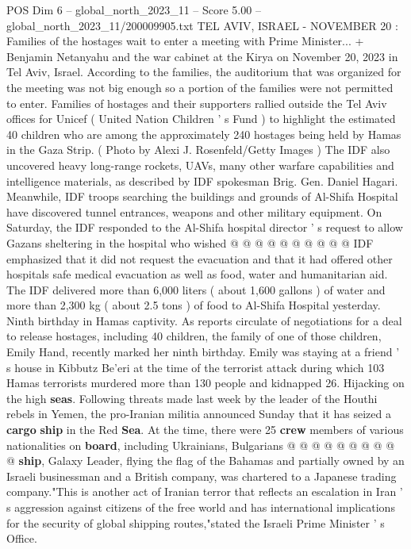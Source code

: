 \begin{textsample}{POS Dim 6 – global\_north\_2023\_11 – Score 5.00 – global\_north\_2023\_11/200009905.txt}  \label{ex:f6_pos_259}
TEL AVIV, ISRAEL - NOVEMBER 20 : Families of the hostages wait to enter a meeting with Prime Minister... + Benjamin Netanyahu and the war cabinet at the Kirya on November 20, 2023 in Tel Aviv, Israel.
According to the families, the auditorium that was organized for the meeting was not big enough so a portion of the families were not permitted to enter.
Families of hostages and their supporters rallied outside the Tel Aviv offices for Unicef ( United Nation Children ' s Fund ) to highlight the estimated 40 children who are among the approximately 240 hostages being held by Hamas in the Gaza Strip. ( Photo by Alexi J.
Rosenfeld/Getty Images ) The IDF also uncovered heavy long-range rockets, UAVs, many other warfare capabilities and intelligence materials, as described by IDF spokesman Brig.
Gen.
Daniel Hagari.
Meanwhile, IDF troops searching the buildings and grounds of Al-Shifa Hospital have discovered tunnel entrances, weapons and other military equipment.
On Saturday, the IDF responded to the Al-Shifa hospital director ' s request to allow Gazans sheltering in the hospital who wished @ @ @ @ @ @ @ @ @ @ IDF emphasized that it did not request the evacuation and that it had offered other hospitals safe medical evacuation as well as food, water and humanitarian aid.
The IDF delivered more than 6,000 liters ( about 1,600 gallons ) of water and more than 2,300 kg ( about 2.5 tons ) of food to Al-Shifa Hospital yesterday.
Ninth birthday in Hamas captivity.
As reports circulate of negotiations for a deal to release hostages, including 40 children, the family of one of those children, Emily Hand, recently marked her ninth birthday.
Emily was staying at a friend ' s house in Kibbutz Be'eri at the time of the terrorist attack during which 103 Hamas terrorists murdered more than 130 people and kidnapped 26.
Hijacking on the high \textbf{seas}.
Following threats made last week by the leader of the Houthi rebels in Yemen, the pro-Iranian militia announced Sunday that it has seized a \textbf{cargo} \textbf{ship} in the Red \textbf{Sea}.
At the time, there were 25 \textbf{crew} members of various nationalities on \textbf{board}, including Ukrainians, Bulgarians @ @ @ @ @ @ @ @ @ @ \textbf{ship}, Galaxy Leader, flying the flag of the Bahamas and partially owned by an Israeli businessman and a British company, was chartered to a Japanese trading company."This is another act of Iranian terror that reflects an escalation in Iran ' s aggression against citizens of the free world and has international implications for the security of global shipping routes,"stated the Israeli Prime Minister ' s Office.

\end{textsample}
